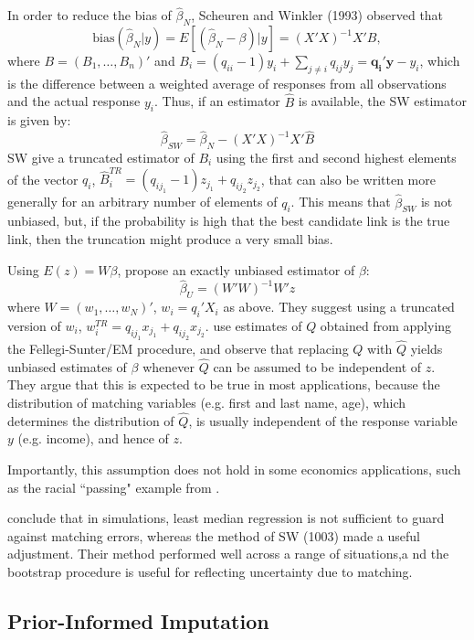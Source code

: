 \documentclass[12pt]{article}
\begin{document}
In order to reduce the bias of $\hat{\beta}_N$, Scheuren and Winkler (1993) %
observed that 
$$\text{bias} (\hat{\beta}_N | y) = E[(\hat{\beta}_N - \beta) | y ] = (X'X)^{-1} X'B,$$ 
where $B = (B_1, \dots, B_n)'$ and $B_i = (q_{ii}-1)y_i + \sum_{j\neq i } q_{ij} y_j = \mathbf{q_i'y} - y_i$, which is the difference between a weighted average of responses from all observations and the actual response $y_i$.  Thus, if an estimator $\hat{B}$ is available, the SW estimator is given by:
$$ \hat{\beta}_{SW} = \hat{\beta}_N - (X'X)^{-1} X' \hat{B}$$ 
SW give a truncated estimator of $B_i$ using the first and second highest elements of the vector $q_i$, $\hat{B}_i^{TR} = (q_{ij_1} - 1) z_{j_1} + q_{ij_2} z_{j_2}$, that can also be written more generally for an arbitrary number of elements of $q_i$.  This means that $\hat{\beta}_{SW}$ is not unbiased, but, if the probability is high that the best candidate link is the true link, then the truncation might produce a very small bias. 

Using $E(z) = W\beta$, \cite{lahiri05} propose an exactly unbiased estimator of $\beta$:
$$ \hat{\beta}_U = (W'W)^{-1} W'z$$ 
where $W = (w_1, \dots, w_N)'$, $w_i = q_i'X_i$ as above.  They suggest using a truncated version of $w_i$, $w_i^{TR} = q_{ij_1} x_{j_1} + q_{ij_2} x_{j_2}$.   \cite{lahiri05} use estimates of $Q$ obtained from applying the Fellegi-Sunter/EM procedure, and observe that replacing $Q$ with $\hat{Q}$ yields unbiased estimates of $\beta$ whenever $\hat{Q}$ can be assumed to be independent of $z$.  They argue that this is expected to be true in most applications, because the distribution of matching variables (e.g. first and last name, age), which determines the distribution of $\hat{Q}$, is usually independent of the response variable $y$ (e.g. income), and hence of $z$.  

Importantly, this assumption does not hold in some economics applications, such as the racial ``passing" example from \cite{nq2015}. 

\cite{lahiri05} conclude that in simulations, least median regression is not sufficient to guard against matching errors, whereas the method of SW (1003) made a useful adjustment.  Their method performed well across a range of situations,a nd the bootstrap procedure is useful for reflecting uncertainty due to matching.  


\subsection{Prior-Informed Imputation \citep{Goldstein2012}}
\end{document}
